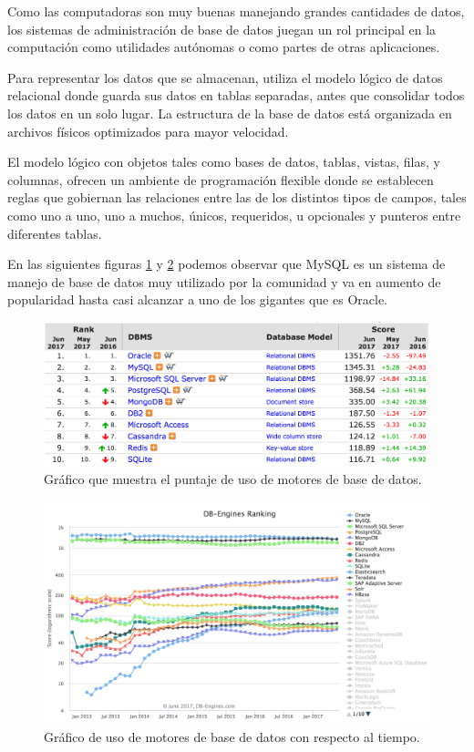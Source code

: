Como las computadoras son muy buenas manejando grandes cantidades de datos, los sistemas de administración de base de datos juegan un rol principal en la computación como utilidades autónomas o como partes de otras aplicaciones.

Para representar los datos que se almacenan, utiliza el modelo lógico de datos relacional donde guarda sus datos en tablas separadas, antes que consolidar todos los datos en un solo lugar. La estructura de la base de datos está organizada en archivos físicos optimizados para mayor velocidad\citep{ronstrom2004mysql}. 

El modelo lógico con objetos tales como bases de datos, tablas, vistas, filas, y columnas, ofrecen un ambiente de programación flexible donde se establecen reglas que gobiernan las relaciones entre las de los distintos tipos de campos, tales como uno a uno, uno a muchos, únicos, requeridos, u opcionales y punteros entre diferentes tablas.

En las siguientes figuras \ref{graph_db_1} y \ref{graph_db_2} podemos observar que MySQL es un sistema de manejo de base de datos muy utilizado por la comunidad y va en aumento de popularidad hasta casi alcanzar a uno de los gigantes que es Oracle.

\begin{figure}[H]
\centering
\includegraphics[width=125mm,scale=1]{Figuras/tecnologias/rank_db_1}
\caption{Gráfico que muestra el puntaje de uso de motores de base de datos.}
  \label{graph_db_1}
\end{figure}

\begin{figure}[H]
\centering
\includegraphics[width=125mm,scale=1]{Figuras/tecnologias/rank_db_2}
\caption{Gráfico de uso de motores de base de datos con respecto al tiempo.}
  \label{graph_db_2}
\end{figure}

